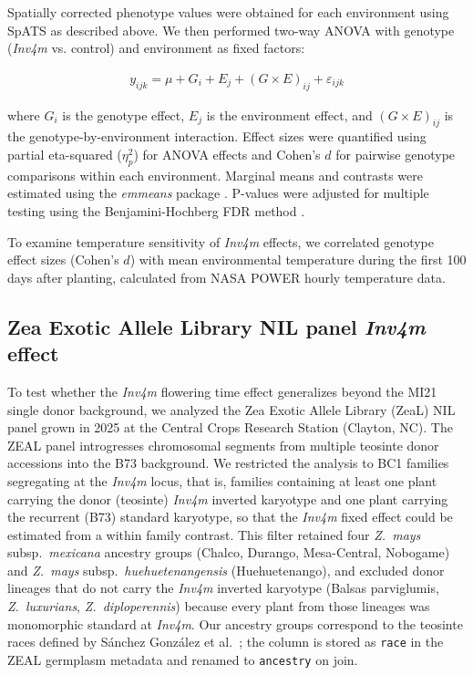 \documentclass[9pt,twocolumn,twoside]{rilabRxiv}
\newcommand{\invfour}{\textit{Inv4m}\xspace}
\begin{document}
Spatially corrected phenotype values were obtained for each environment using SpATS as described above.
We then performed two-way ANOVA with genotype (\invfour vs. control) and environment as fixed factors:

\begin{eqnarray}
\label{eq:gxe_model}
y_{ijk} = \mu + G_i + E_j + (G \times E)_{ij} + \varepsilon_{ijk}
\end{eqnarray}

where $G_i$ is the genotype effect, $E_j$ is the environment effect, and $(G \times E)_{ij}$ is the genotype-by-environment interaction.
Effect sizes were quantified using partial eta-squared ($\eta^2_p$) for ANOVA effects and Cohen's $d$ for pairwise genotype comparisons within each environment.
Marginal means and contrasts were estimated using the \textit{emmeans} package \cite{lenth2025}.
P-values were adjusted for multiple testing using the Benjamini-Hochberg FDR method \cite{benjamini1995}.

To examine temperature sensitivity of \invfour effects, we correlated genotype effect sizes (Cohen's $d$) with mean environmental temperature during the first 100 days after planting, calculated from NASA POWER hourly temperature data.

\subsection{Zea Exotic Allele Library NIL panel \invfour effect}

To test whether the \invfour flowering time effect generalizes beyond the MI21 single donor background, we analyzed the Zea Exotic Allele Library (ZeaL) NIL panel grown in 2025 at the Central Crops Research Station (Clayton, NC).
The ZEAL panel introgresses chromosomal segments from multiple teosinte donor accessions into the B73 background.
We restricted the analysis to BC1 families segregating at the \invfour locus, that is, families containing at least one plant carrying the donor (teosinte) \invfour inverted karyotype and one plant carrying the recurrent (B73) standard karyotype, so that the \invfour fixed effect could be estimated from a within family contrast.
This filter retained four \textit{Z.~mays} subsp.\ \textit{mexicana} ancestry groups (Chalco, Durango, Mesa-Central, Nobogame) and \textit{Z.~mays} subsp.\ \textit{huehuetenangensis} (Huehuetenango), and excluded donor lineages that do not carry the \invfour inverted karyotype (Balsas parviglumis, \textit{Z.~luxurians}, \textit{Z.~diploperennis}) because every plant from those lineages was monomorphic standard at \invfour.
Our ancestry groups correspond to the teosinte races defined by Sánchez González et al.~\cite{sanchez-gonzalez2018}; the column is stored as \texttt{race} in the ZEAL germplasm metadata and renamed to \texttt{ancestry} on join.
\end{document}
